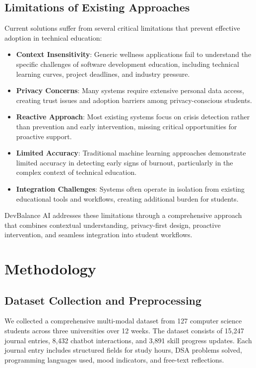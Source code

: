 \documentclass[conference,10pt]{IEEEtran}
\begin{document}
\subsection{Limitations of Existing Approaches}

Current solutions suffer from several critical limitations that prevent effective adoption in technical education:

\begin{itemize}
\item \textbf{Context Insensitivity}: Generic wellness applications fail to understand the specific challenges of software development education, including technical learning curves, project deadlines, and industry pressure.

\item \textbf{Privacy Concerns}: Many systems require extensive personal data access, creating trust issues and adoption barriers among privacy-conscious students.

\item \textbf{Reactive Approach}: Most existing systems focus on crisis detection rather than prevention and early intervention, missing critical opportunities for proactive support.

\item \textbf{Limited Accuracy}: Traditional machine learning approaches demonstrate limited accuracy in detecting early signs of burnout, particularly in the complex context of technical education.

\item \textbf{Integration Challenges}: Systems often operate in isolation from existing educational tools and workflows, creating additional burden for students.
\end{itemize}

DevBalance AI addresses these limitations through a comprehensive approach that combines contextual understanding, privacy-first design, proactive intervention, and seamless integration into student workflows.

\section{Methodology}

\subsection{Dataset Collection and Preprocessing}

We collected a comprehensive multi-modal dataset from 127 computer science students across three universities over 12 weeks. The dataset consists of 15,247 journal entries, 8,432 chatbot interactions, and 3,891 skill progress updates. Each journal entry includes structured fields for study hours, DSA problems solved, programming languages used, mood indicators, and free-text reflections.
\end{document}
